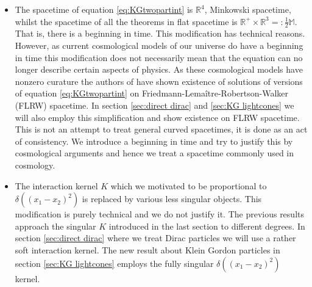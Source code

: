 \documentclass[b5paper,draft,openbib,12pt]{memoir}
\newtheorem{Thm}[Def]{Theorem}
\newcommand{\noch}[1]{ \todo[color=blue!20]{Todo: #1} }
\begin{document}
\begin{itemize}
\item The spacetime of equation \eqref{eq:KGtwopartint} is \(\mathbb{R}^4\), Minkowski spacetime, whilst 
the spacetime of all the theorems in flat spacetime is 
\(\mathbb{R}^+\times\mathbb{R}^3=:\frac{1}{2}\mathbb{M}\). 
That is, there is a beginning in time. This modification has technical reasons. However, as current 
cosmological models of our universe do have a beginning in time this modification does not necessarily
mean that the equation can no longer describe certain aspects of physics. As these cosmological models 
have nonzero curature the authors of \cite{lienertcurved} 
have shown existence of solutions of versions of equation \eqref{eq:KGtwopartint}
on Friedmann-Lemaître-Robertson-Walker (FLRW) spacetime. In section \ref{sec:direct dirac} and 
\ref{sec:KG lightcones} \noch{really also in the second paper?} we will also employ this 
simplification and show existence on FLRW spacetime. This is not an attempt to treat 
general curved spacetimes, it is done as an act of consistency. We introduce a beginning in time 
and try to justify this by cosmological arguments and hence we treat a spacetime commonly used
in cosmology.
\item The interaction kernel \(K\) which we motivated to be proportional to \(\delta((x_1-x_2)^2)\)
is replaced by various less singular objects. This modification is purely technical and we do not 
justify it. The previous results approach the singular \(K\) introduced in the last section to different
degrees. In section \ref{sec:direct dirac} where we treat Dirac particles 
we will use a rather soft interaction kernel. The new result about Klein Gordon particles in 
section \ref{sec:KG lightcones} employs the fully singular \(\delta((x_1-x_2)^2)\) kernel. 
\end{itemize}

\end{document}
